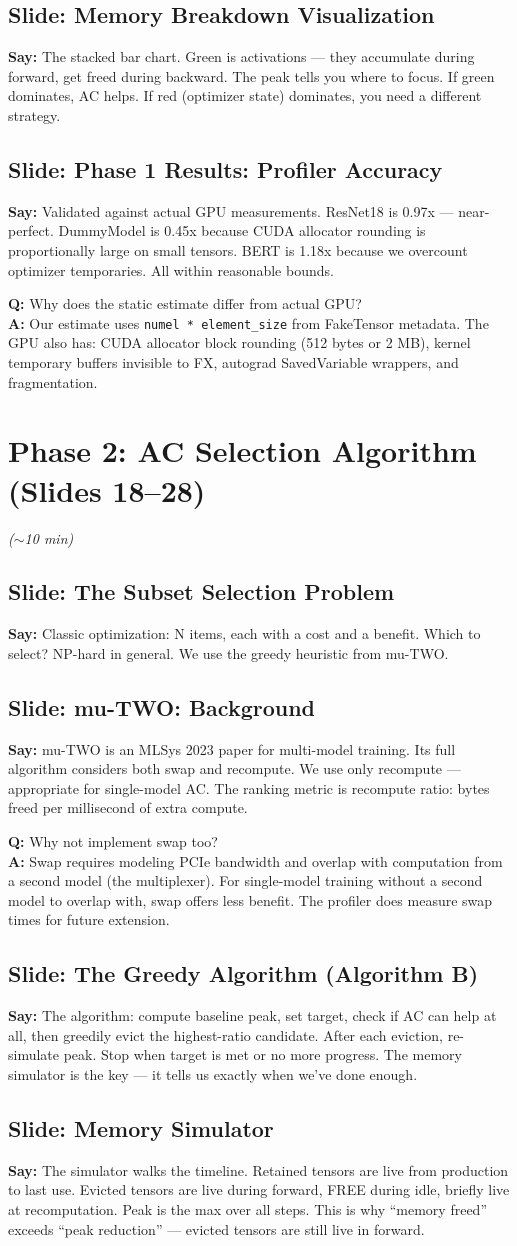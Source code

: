 \documentclass[11pt]{article}
\newcommand{\slide}[1]{\subsection*{Slide: #1}}
\newcommand{\say}[1]{\textbf{Say:} #1}
\newcommand{\qa}[2]{\textcolor{question}{\textbf{Q:} #1} \\ \textbf{A:} #2}
\newcommand{\timing}[1]{\hfill\textcolor{note}{\textit{(#1)}}}
\begin{document}
\slide{Memory Breakdown Visualization}
\say{The stacked bar chart. Green is activations --- they accumulate during forward, get freed during backward. The peak tells you where to focus. If green dominates, AC helps. If red (optimizer state) dominates, you need a different strategy.}

\slide{Phase 1 Results: Profiler Accuracy}
\say{Validated against actual GPU measurements. ResNet18 is 0.97x --- near-perfect. DummyModel is 0.45x because CUDA allocator rounding is proportionally large on small tensors. BERT is 1.18x because we overcount optimizer temporaries. All within reasonable bounds.}

\qa{Why does the static estimate differ from actual GPU?}{Our estimate uses \texttt{numel * element\_size} from FakeTensor metadata. The GPU also has: CUDA allocator block rounding (512 bytes or 2 MB), kernel temporary buffers invisible to FX, autograd SavedVariable wrappers, and fragmentation.}


\section{Phase 2: AC Selection Algorithm (Slides 18--28)} \timing{$\sim$10 min}

\slide{The Subset Selection Problem}
\say{Classic optimization: N items, each with a cost and a benefit. Which to select? NP-hard in general. We use the greedy heuristic from mu-TWO.}

\slide{mu-TWO: Background}
\say{mu-TWO is an MLSys 2023 paper for multi-model training. Its full algorithm considers both swap and recompute. We use only recompute --- appropriate for single-model AC. The ranking metric is recompute ratio: bytes freed per millisecond of extra compute.}

\qa{Why not implement swap too?}{Swap requires modeling PCIe bandwidth and overlap with computation from a second model (the multiplexer). For single-model training without a second model to overlap with, swap offers less benefit. The profiler does measure swap times for future extension.}

\slide{The Greedy Algorithm (Algorithm B)}
\say{The algorithm: compute baseline peak, set target, check if AC can help at all, then greedily evict the highest-ratio candidate. After each eviction, re-simulate peak. Stop when target is met or no more progress. The memory simulator is the key --- it tells us exactly when we've done enough.}

\slide{Memory Simulator}
\say{The simulator walks the timeline. Retained tensors are live from production to last use. Evicted tensors are live during forward, FREE during idle, briefly live at recomputation. Peak is the max over all steps. This is why ``memory freed'' exceeds ``peak reduction'' --- evicted tensors are still live in forward.}
\end{document}
